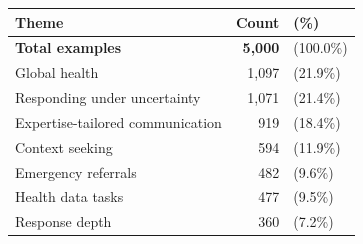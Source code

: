 
\begin{tabulary}{\linewidth}{LRL}
\toprule
Theme & Count & (\%) \\
\midrule
\textbf{Total examples} & \textbf{5,000} & (100.0\%) \\
Global health & 1,097 & (21.9\%) \\
Responding under uncertainty & 1,071 & (21.4\%) \\
Expertise-tailored communication & 919 & (18.4\%) \\
Context seeking & 594 & (11.9\%) \\
Emergency referrals & 482 & (9.6\%) \\
Health data tasks & 477 & (9.5\%) \\
Response depth & 360 & (7.2\%) \\
\bottomrule
\end{tabulary}